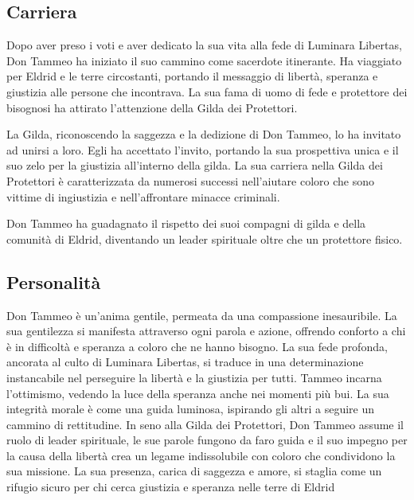 \subsection{Carriera}\label{carriera}


Dopo aver preso i voti e aver dedicato la sua vita alla fede di Luminara
Libertas, Don Tammeo ha iniziato il suo cammino come sacerdote
itinerante. Ha viaggiato per Eldrid e le terre circostanti, portando il
messaggio di libertà, speranza e giustizia alle persone che incontrava.
La sua fama di uomo di fede e protettore dei bisognosi ha attirato
l'attenzione della Gilda dei Protettori.

La Gilda, riconoscendo la saggezza e la dedizione di Don Tammeo, lo ha
invitato ad unirsi a loro. Egli ha accettato l'invito, portando la sua
prospettiva unica e il suo zelo per la giustizia all'interno della
gilda. La sua carriera nella Gilda dei Protettori è caratterizzata da
numerosi successi nell'aiutare coloro che sono vittime di ingiustizia e
nell'affrontare minacce criminali.

Don Tammeo ha guadagnato il rispetto dei suoi compagni di gilda e della
comunità di Eldrid, diventando un leader spirituale oltre che un
protettore fisico.

\subsection{Personalità}\label{personalituxe0}


Don Tammeo è un'anima gentile, permeata da una compassione inesauribile.
La sua gentilezza si manifesta attraverso ogni parola e azione, offrendo
conforto a chi è in difficoltà e speranza a coloro che ne hanno bisogno.
La sua fede profonda, ancorata al culto di Luminara Libertas, si traduce
in una determinazione instancabile nel perseguire la libertà e la
giustizia per tutti. Tammeo incarna l'ottimismo, vedendo la luce della
speranza anche nei momenti più bui. La sua integrità morale è come una
guida luminosa, ispirando gli altri a seguire un cammino di rettitudine.
In seno alla Gilda dei Protettori, Don Tammeo assume il ruolo di leader
spirituale, le sue parole fungono da faro guida e il suo impegno per la
causa della libertà crea un legame indissolubile con coloro che
condividono la sua missione. La sua presenza, carica di saggezza e
amore, si staglia come un rifugio sicuro per chi cerca giustizia e
speranza nelle terre di Eldrid

